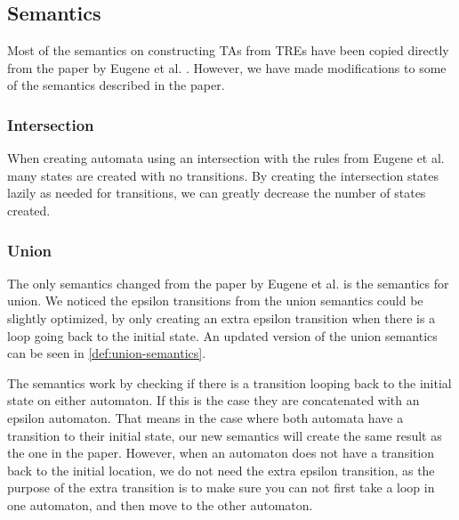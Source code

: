 \subsection{Semantics}\label{subsec:semantics}
\begin{comment}
    Where do most of our semantics come from?
    
    Intersection semantics
     - Motivation

    Describe union semantics
     - Motivation
     - New definition
     - Visual change
    
    Describe MatchAny semantics
     - Motivation
     - Definition
     - Visual
\end{comment}

Most of the semantics on constructing TAs from TREs have been copied directly from the paper by Eugene et al. \cite{Eugene2001}. However, we have made modifications to some of the semantics described in the paper.

\subsubsection{Intersection}
When creating automata using an intersection with the rules from Eugene et al.
many states are created with no transitions.
By creating the intersection states lazily as needed for transitions, we can greatly decrease the number of states created.

\subsubsection{Union}
The only semantics changed from the paper by Eugene et al. is the semantics for union. We noticed the epsilon transitions from the union semantics could be slightly optimized, by only creating an extra epsilon transition when there is a loop going back to the initial state. An updated version of the union semantics can be seen in \cref{def:union-semantics}.



The semantics work by checking if there is a transition looping back to the initial state on either automaton. If this is the case they are concatenated with an epsilon automaton. That means in the case where both automata have a transition to their initial state, our new semantics will create the same result as the one in the paper. However, when an automaton does not have a transition back to the initial location, we do not need the extra epsilon transition, as the purpose of the extra transition is to make sure you can not first take a loop in one automaton, and then move to the other automaton.

